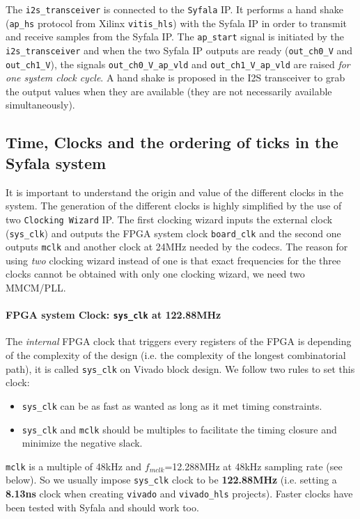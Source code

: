 \documentclass[11pt]{article}
\numberwithin{equation}{section}
\numberwithin{figure}{section}
\begin{document}
The {\tt i2s\_transceiver} is connected to the {\tt Syfala} IP. It performs a hand shake ({\tt ap\_hs} protocol from Xilinx {\tt vitis\_hls}) with the Syfala IP in order to transmit and receive samples from the Syfala IP. The {\tt ap\_start} signal is initiated by the {\tt i2s\_transceiver} and when the two Syfala IP outputs are ready ({\tt out\_ch0\_V} and {\tt out\_ch1\_V}), the signals {\tt out\_ch0\_V\_ap\_vld} and {\tt out\_ch1\_V\_ap\_vld} are raised {\em for one system clock cycle}. A hand shake is proposed in the I2S transceiver to grab the output values when they are available (they are not necessarily available simultaneously). 


\subsection{Time, Clocks and the ordering of ticks in the Syfala system}

It is important to understand the origin and value of the different clocks in the system. The generation of the different clocks is highly simplified by the use of two {\tt Clocking Wizard} IP. The first clocking wizard  inputs the  external clock ({\tt sys\_clk}) and outputs the FPGA system clock {\tt board\_clk} and the second one outputs {\tt mclk} and another clock at 24MHz needed by the codecs. The reason for using {\em two} clocking wizard instead of one is that exact frequencies for the three clocks cannot be obtained with only one clocking wizard, we need two MMCM/PLL.   

\paragraph{FPGA system Clock: {\tt sys\_clk} at 122.88MHz}
The {\em internal} FPGA clock that triggers every registers of the FPGA is depending of the complexity of the design (i.e. the complexity of the longest combinatorial path), it is called {\tt sys\_clk} on Vivado block design. We follow two rules to set this clock:
\begin{itemize}
\item {\tt sys\_clk} can be as fast as wanted as long as it met timing constraints.
\item  {\tt sys\_clk} and {\tt mclk} should be multiples to facilitate the timing closure and minimize the negative slack.
\end{itemize}
{\tt mclk} is a multiple of 48kHz and $f_{mclk}$=12.288MHz at 48kHz sampling rate (see below). So we usually impose {\tt sys\_clk} clock to be {\bf 122.88MHz} (i.e. setting  a {\bf 8.13ns} clock when creating {\tt vivado} and {\tt vivado\_hls} projects). Faster clocks have been tested with Syfala and should work too.
\end{document}
